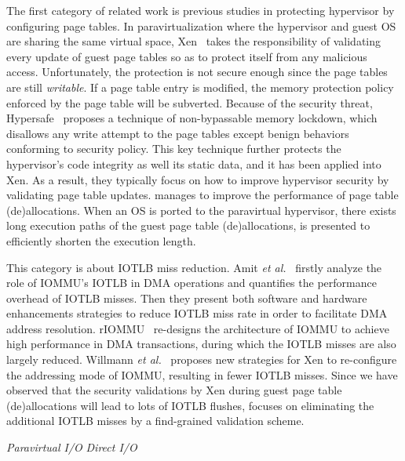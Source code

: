  The first category of related work is previous studies in protecting hypervisor by configuring page tables. In paravirtualization where the hypervisor and guest OS are sharing the same virtual space, Xen~\cite{barham2003xen} takes the responsibility of validating every update of guest page tables so as to protect itself from any malicious access. Unfortunately, the protection is not secure enough since the page tables are still \emph{writable}. If a page table entry is modified, the memory protection policy enforced by the page table will be subverted. Because of the security threat, Hypersafe~\cite{wang2010hypersafe} proposes a technique of non-bypassable memory lockdown, which disallows any write attempt to the page tables except benign behaviors conforming to security policy. This key technique further protects the hypervisor's code integrity as well its static data, and it has been applied into Xen.
As a result, they typically focus on how to improve hypervisor security by validating page table updates. \name manages to improve the performance of page table (de)allocations. When an OS is ported to the paravirtual hypervisor, there exists long execution paths of the guest page table (de)allocations, \name is presented to efficiently shorten the execution length.

 This category is about IOTLB miss reduction. Amit \emph{et al.}~\cite{amit2012iommu} firstly analyze the role of IOMMU's IOTLB in DMA operations and quantifies the performance overhead of IOTLB misses. Then they present both software and hardware enhancements strategies to reduce IOTLB miss rate in order to facilitate DMA address resolution. rIOMMU~\cite{malka2015riommu} re-designs the architecture of IOMMU to achieve high performance in DMA transactions, during which the IOTLB misses are also largely reduced. Willmann \emph{et al.}~\cite{willmann2008protection} proposes new strategies for Xen to re-configure the addressing mode of IOMMU, resulting in fewer IOTLB misses.
Since we have observed that the security validations by Xen during guest page table (de)allocations will lead to lots of IOTLB flushes, \name focuses on eliminating the additional IOTLB misses by a find-grained validation scheme.

\emph{Paravirtual I/O}
\emph{Direct I/O}